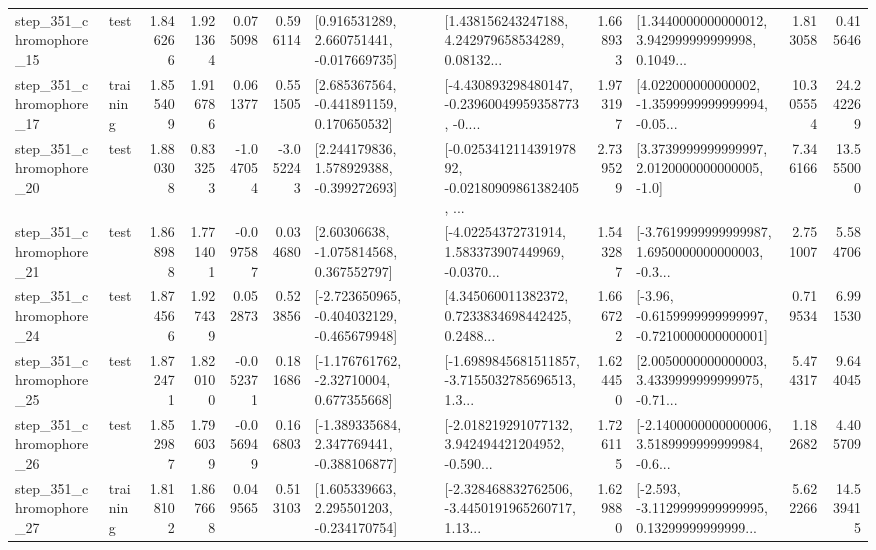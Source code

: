\begin{tabular}{llrrrrllrlrr}
  step\_351\_chromophore\_15 &      test &      1.846266 &    1.921364 &      0.075098 &  0.596114 &    [0.916531289, 2.660751441, -0.017669735] &  [1.438156243247188, 4.242979658534289, 0.08132... &       1.668933 &  [1.3440000000000012, 3.942999999999998, 0.1049... &            1.813058 &          0.415646 \\
  step\_351\_chromophore\_17 &  training &      1.855409 &    1.916786 &      0.061377 &  0.551505 &    [2.685367564, -0.441891159, 0.170650532] &  [-4.430893298480147, -0.23960049959358773, -0.... &       1.973197 &  [4.022000000000002, -1.3599999999999994, -0.05... &           10.305554 &         24.242269 \\
  step\_351\_chromophore\_20 &      test &      1.880308 &    0.833253 &     -1.047054 & -3.052243 &    [2.244179836, 1.578929388, -0.399272693] &  [-0.025341211439197892, -0.02180909861382405, ... &       2.739529 &     [3.3739999999999997, 2.0120000000000005, -1.0] &            7.346166 &         13.555000 \\
  step\_351\_chromophore\_21 &      test &      1.868988 &    1.771401 &     -0.097587 &  0.034680 &     [2.60306638, -1.075814568, 0.367552797] &  [-4.02254372731914, 1.583373907449969, -0.0370... &       1.543287 &  [-3.7619999999999987, 1.6950000000000003, -0.3... &            2.751007 &          5.584706 \\
  step\_351\_chromophore\_24 &      test &      1.874566 &    1.927439 &      0.052873 &  0.523856 &  [-2.723650965, -0.404032129, -0.465679948] &  [4.345060011382372, 0.7233834698442425, 0.2488... &       1.666722 &  [-3.96, -0.6159999999999997, -0.7210000000000001] &            0.719534 &          6.991530 \\
  step\_351\_chromophore\_25 &      test &      1.872471 &    1.820100 &     -0.052371 &  0.181686 &    [-1.176761762, -2.32710004, 0.677355668] &  [-1.6989845681511857, -3.7155032785696513, 1.3... &       1.624450 &  [2.0050000000000003, 3.4339999999999975, -0.71... &            5.474317 &          9.644045 \\
  step\_351\_chromophore\_26 &      test &      1.852987 &    1.796039 &     -0.056949 &  0.166803 &   [-1.389335684, 2.347769441, -0.388106877] &  [-2.018219291077132, 3.942494421204952, -0.590... &       1.726115 &  [-2.1400000000000006, 3.5189999999999984, -0.6... &            1.182682 &          4.405709 \\
  step\_351\_chromophore\_27 &  training &      1.818102 &    1.867668 &      0.049565 &  0.513103 &    [1.605339663, 2.295501203, -0.234170754] &  [-2.328468832762506, -3.4450191965260717, 1.13... &       1.629880 &  [-2.593, -3.1129999999999995, 0.13299999999999... &            5.622266 &         14.539415 \\

\end{tabular}
